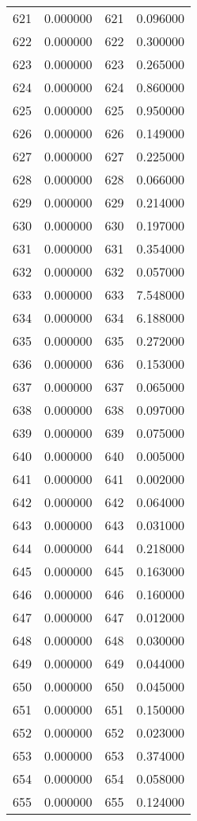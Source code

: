 \documentclass[12pt]{article}
\begin{document}
\begin{longtable}{@{}cccc@{}}
621 & 0.000000 & 621 & 0.096000 \\
622 & 0.000000 & 622 & 0.300000 \\
623 & 0.000000 & 623 & 0.265000 \\
624 & 0.000000 & 624 & 0.860000 \\
625 & 0.000000 & 625 & 0.950000 \\
626 & 0.000000 & 626 & 0.149000 \\
627 & 0.000000 & 627 & 0.225000 \\
628 & 0.000000 & 628 & 0.066000 \\
629 & 0.000000 & 629 & 0.214000 \\
630 & 0.000000 & 630 & 0.197000 \\
631 & 0.000000 & 631 & 0.354000 \\
632 & 0.000000 & 632 & 0.057000 \\
633 & 0.000000 & 633 & 7.548000 \\
634 & 0.000000 & 634 & 6.188000 \\
635 & 0.000000 & 635 & 0.272000 \\
636 & 0.000000 & 636 & 0.153000 \\
637 & 0.000000 & 637 & 0.065000 \\
638 & 0.000000 & 638 & 0.097000 \\
639 & 0.000000 & 639 & 0.075000 \\
640 & 0.000000 & 640 & 0.005000 \\
641 & 0.000000 & 641 & 0.002000 \\
642 & 0.000000 & 642 & 0.064000 \\
643 & 0.000000 & 643 & 0.031000 \\
644 & 0.000000 & 644 & 0.218000 \\
645 & 0.000000 & 645 & 0.163000 \\
646 & 0.000000 & 646 & 0.160000 \\
647 & 0.000000 & 647 & 0.012000 \\
648 & 0.000000 & 648 & 0.030000 \\
649 & 0.000000 & 649 & 0.044000 \\
650 & 0.000000 & 650 & 0.045000 \\
651 & 0.000000 & 651 & 0.150000 \\
652 & 0.000000 & 652 & 0.023000 \\
653 & 0.000000 & 653 & 0.374000 \\
654 & 0.000000 & 654 & 0.058000 \\
655 & 0.000000 & 655 & 0.124000 \\

\end{longtable}
\end{document}
